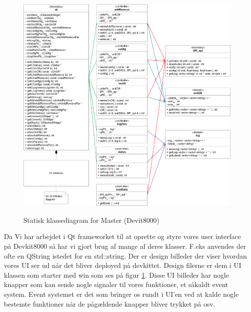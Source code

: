
\begin{figure}[!htbp] \centering
{\includegraphics[scale=0.7]{filer/design/sw_class_devkit_static}}
\caption{Statisk klassediagram for Master (Devit8000)}
\label{fig:class_static_dev}
\end{figure}

Da Vi har arbejdet i Qt frameworket til at oprette og styre vores user interface på Devkit8000 så har vi gjort brug af mange af deres klasser. F.eks anvendes der ofte en QString istedet for en std::string. Der er design billeder der viser hvordan vores UI ser ud når det bliver deployed på devkittet. Design filerne er dem i UI klassen som starter med win som ses på figur \ref{fig:class_static_dev}. Disse UI billeder har nogle knapper som kan sende nogle signaler til vores funktioner, et såkaldt event system. Event systemet er det som bringer os rundt i UI'en ved at kalde nogle bestemte funktioner når de pågældende knapper bliver trykket på osv.
